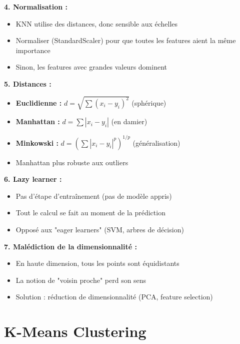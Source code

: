\documentclass[11pt,a4paper]{article}
\begin{document}
\begin{solutionbox}
\textbf{4. Normalisation :}
\begin{itemize}
    \item KNN utilise des distances, donc sensible aux échelles
    \item Normaliser (StandardScaler) pour que toutes les features aient la même importance
    \item Sinon, les features avec grandes valeurs dominent
\end{itemize}

\textbf{5. Distances :}
\begin{itemize}
    \item \textbf{Euclidienne :} $d = \sqrt{\sum(x_i - y_i)^2}$ (sphérique)
    \item \textbf{Manhattan :} $d = \sum|x_i - y_i|$ (en damier)
    \item \textbf{Minkowski :} $d = (\sum|x_i - y_i|^p)^{1/p}$ (généralisation)
    \item Manhattan plus robuste aux outliers
\end{itemize}

\textbf{6. Lazy learner :}
\begin{itemize}
    \item Pas d'étape d'entraînement (pas de modèle appris)
    \item Tout le calcul se fait au moment de la prédiction
    \item Opposé aux "eager learners" (SVM, arbres de décision)
\end{itemize}

\textbf{7. Malédiction de la dimensionnalité :}
\begin{itemize}
    \item En haute dimension, tous les points sont équidistants
    \item La notion de "voisin proche" perd son sens
    \item Solution : réduction de dimensionnalité (PCA, feature selection)
\end{itemize}
\end{solutionbox}

\newpage


\section{K-Means Clustering}
\end{document}
